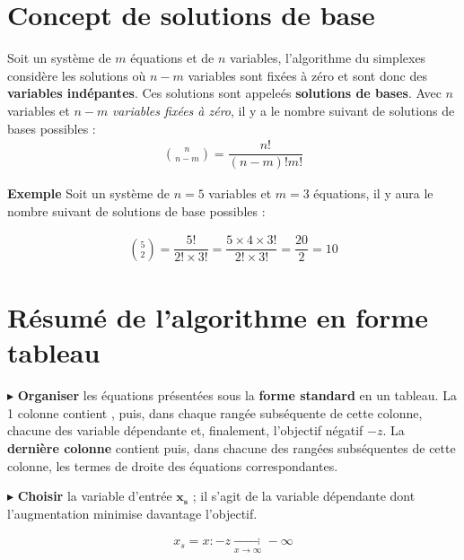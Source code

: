\documentclass{report}
\begin{document}
\begin{multicols*}{2}
    \section{Concept de solutions de base}
    Soit un système de $m$ équations et de $n$ variables, l'algorithme 
    du simplexes considère les solutions où $n - m$ variables sont 
    fixées à zéro 
    et sont donc des \textbf{variables indépantes}. 
    Ces solutions sont appeleés 
    \textbf{solutions de bases}. 
    Avec $n$ variables et $n - m$ \textit{variables fixées à zéro}, il y a  
    le nombre suivant de solutions de bases possibles :
    \begin{align*}
        \boxed{{n \choose n - m} = \dfrac{n!}{(n - m )! m!}}
    \end{align*}

    
    \noindent
    \textbf{Exemple} 
    Soit un système de $n = 5$ variables et $m = 3$ équations, 
    il y aura le nombre suivant de solutions de base possibles :
     
    \begin{align*}
            {5 \choose 2} = \dfrac{5!}{2! \times 3!} = \dfrac{5 \times 4 \times 3!}{2! \times 3!} = \dfrac{20}{2} = 10 
    \end{align*}

\section{Résumé de l'algorithme en forme tableau}

\noindent 
    $\blacktriangleright$  \textbf{Organiser} les équations présentées sous 
    la \textbf{forme standard} en un tableau. La 1 colonne 
    contient , puis, dans chaque rangée subséquente 
    de cette colonne, chacune des variable dépendante et, finalement, 
    l'objectif négatif $-z$. La \textbf{dernière colonne} contient 
     puis, dans chacune des rangées subséquentes de cette 
    colonne, les termes de droite des équations correspondantes. 


    \noindent 
    $\blacktriangleright$
    \textbf{Choisir} la variable d'entrée $\boldsymbol{x_s}$
    ; il s'agit de la variable
    dépendante dont l'augmentation minimise davantage l'objectif. 

    \begin{align*}
        \boxed{
        x_s = x : -z \underset{x \to \infty}{\longrightarrow} -\infty
        }
    \end{align*}                    



\end{multicols*}
\end{document}
